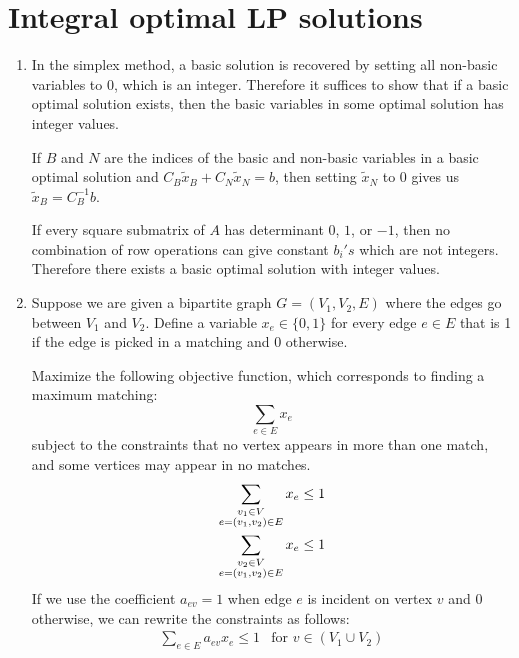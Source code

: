 \documentclass[12pt]{article}
\begin{document}
\pagebreak

\section{Integral optimal LP solutions}

\begin{enumerate}
\item %
In the simplex method, a basic solution is recovered by setting all non-basic
variables to 0, which is an integer. Therefore it suffices to show that
if a basic optimal solution exists, then the basic variables in some
optimal solution has integer values.

If $B$ and $N$ are the indices of the basic and non-basic variables in
a basic optimal solution and $C_B\tilde{x}_B + C_N\tilde{x}_N = b$, then
setting $\tilde{x}_N$ to 0 gives us $\tilde{x}_B = C_B^{-1}b$.

If every square submatrix of $A$ has determinant $0$, $1$, or $-1$, then
no combination of row operations can give constant $b_i's$ which are
not integers. Therefore there exists a basic optimal solution with
integer values.

\item %
Suppose we are given a bipartite graph $G = (V_1,V_2,E)$ where
the edges go between $V_1$ and $V_2$.
Define a variable $x_e \in \{0,1\}$ for every edge $e \in E$ that is 1 if the
edge is picked in a matching and 0 otherwise.

Maximize the following objective function, which corresponds to finding a
maximum matching:
%
\begin{displaymath}
\sum_{e \in E} x_e
\end{displaymath}
%
subject to the constraints that no vertex appears in more than one match,
and some vertices may appear in no matches.
%
\begin{eqnarray*}
\sum_{\begin{subarray}{c} v_1 \in V\\e=(v_1,v_2) \in E\end{subarray}} x_e \le 1\\
\sum_{\begin{subarray}{c} v_2 \in V\\e=(v_1,v_2) \in E\end{subarray}} x_e \le 1\\
\end{eqnarray*}
%
If we use the coefficient $a_{ev}=1$ when edge $e$ is incident on vertex $v$ and
0 otherwise, we can rewrite the constraints as follows:
%
\begin{eqnarray*}
\sum_{e \in E} a_{ev}x_e \le 1 & \textrm{for $v \in (V_1 \cup  V_2)$}\\
\end{eqnarray*}


\end{enumerate}
\end{document}
